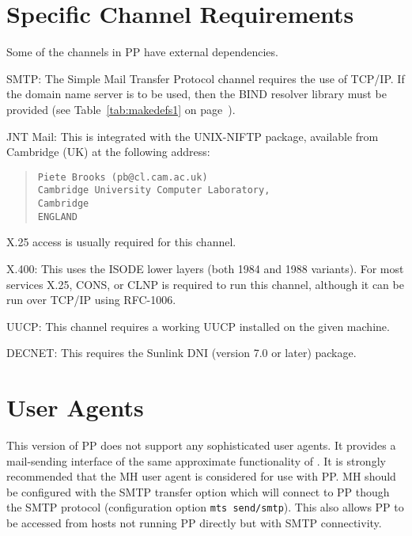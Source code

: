 \section{Specific Channel Requirements}

Some of the channels in PP have external dependencies. 
\begin{describe}
\item[SMTP:]	The Simple Mail Transfer Protocol channel requires the
use of TCP/IP. If the domain name server is to be used, then the
BIND\cite{BIND} resolver library must be provided (see
Table~\ref{tab:makedefs1} on page~\pageref{tab:makedefs1}).

\item[JNT Mail:]	This is integrated with the UNIX-NIFTP package,
available from Cambridge (UK) at the following address:
\begin{quote}\begin{verbatim}
Piete Brooks (pb@cl.cam.ac.uk)
Cambridge University Computer Laboratory,
Cambridge
ENGLAND
\end{verbatim}\end{quote}

X.25 access is usually required for this channel.

\item[X.400:]	This uses the ISODE lower layers (both 1984 and 1988
variants). For most services X.25, CONS, or CLNP is required to run
this channel, although it can be run over TCP/IP using
RFC-1006\cite{TSAP.on.TCP}.

\item[UUCP:]	This channel requires a working UUCP
installed on the given machine.

\item[DECNET:] This requires the Sunlink DNI (version 7.0 or later) package.
\end{describe}

\section{User Agents}

This version of PP does not support any sophisticated user agents. It
provides a mail-sending interface of the same approximate
functionality of . It is strongly recommended that the
MH\cite{MH6.5} user agent is considered for use with PP. MH should be
configured with the SMTP transfer option which will connect to PP
though the SMTP protocol (configuration option \verb|mts send/smtp|).
This also allows PP to be accessed from hosts not running PP
directly but with SMTP connectivity. 

